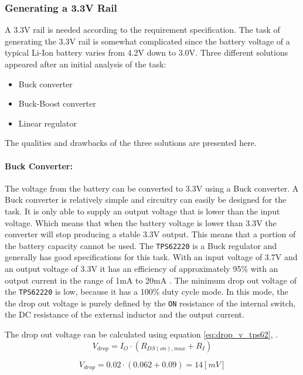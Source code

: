 \subsubsection{Generating a 3.3V Rail}
A 3.3V rail is needed according to the requirement specification.
The task of generating the 3.3V rail is somewhat complicated since the battery voltage of a typical Li-Ion battery varies from 4.2V down to 3.0V.
Three different solutions appeared after an initial analysis of the task:

\begin{itemize}
	\item Buck converter
	\item Buck-Boost converter
	\item Linear regulator
\end{itemize}

The qualities and drawbacks of the three solutions are presented here.

\paragraph{Buck Converter:}
The voltage from the battery can be converted to 3.3V using a Buck converter.
A Buck converter is relatively simple and circuitry can easily be designed for the task.
It is only able to supply an output voltage that is lower than the input voltage.
Which means that when the battery voltage is lower than 3.3V the converter will stop producing a stable 3.3V output.
This means that a portion of the battery capacity cannot be used.
The \texttt{TPS62220} is a Buck regulator and generally has good specifications for this task. 
With an input voltage of 3.7V and an output voltage of 3.3V it has an efficiency of approximately 95\% with an output current in the range of 1mA to 20mA \cite{TPS6222}.
The minimum drop out voltage of the \texttt{TPS62220} is low, because it has a 100\% duty cycle mode.
In this mode, the the drop out voltage is purely defined by the \texttt{ON} resistance of the internal switch, the DC resistance of the external inductor and the output current.

The drop out voltage can be calculated using equation \ref{eq:drop_v_tps62}, \cite{TPS6222}.
\begin{equation}
	V_{drop} = I_{O} \cdot (R_{DS(on),max}+R_I)
	\label{eq:drop_v_tps62}
\end{equation}

\begin{equation}
	V_{drop} = 0.02 \cdot (0.062+0.09) = 14 [mV]
	\label{eq:drop_v_tps62_2}
\end{equation}

